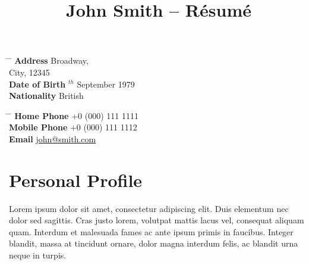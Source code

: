 \documentclass[10pt]{article} %
\begin{document}

\title{John Smith -- Résumé} %


\parbox{0.5\textwidth}{ %
    \begin{tabbing} %
        \hspace{3cm} \= \hspace{4cm} \= \kill %
        {\bf Address}  Broadway,\\ %
        \> City, 12345 \\ %
        {\bf Date of Birth} $^{th}$ September 1979 \\ %
        {\bf Nationality} \> British %
    \end{tabbing}}
\hfill %
\parbox{0.5\textwidth}{ %
    \begin{tabbing} %
        \hspace{3cm} \= \hspace{4cm} \= \kill %
        {\bf Home Phone} \> +0 (000) 111 1111 \\ %
        {\bf Mobile Phone} \> +0 (000) 111 1112 \\ %
        {\bf Email} \> \href{mailto:john@smith.com}{john@smith.com} \\ %
    \end{tabbing}}


\section{Personal Profile}

Lorem ipsum dolor sit amet, consectetur adipiscing elit. Duis elementum nec dolor sed sagittis. Cras justo lorem, volutpat mattis lacus vel, consequat aliquam quam. Interdum et malesuada fames ac ante ipsum primis in faucibus. Integer blandit, massa at tincidunt ornare, dolor magna interdum felis, ac blandit urna neque in turpis.
\end{document}
